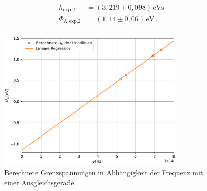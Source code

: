 \begin{align*}
    h_{\text{exp,}2} &= (3,219 \pm 0,098)\,\unit{\eV\second}\\
    \Phi_{\text{A,exp,}2} &= (1,14 \pm 0,06) \, \unit{\eV}\,.\\
\end{align*}
\begin{figure}[H]
    \centering
    \includegraphics[width=0.8\textwidth]{Plots/planck_berechnet.pdf}
    \caption{Berechnete Grenzspannungen in Abhängigkeit der Frequenz mit einer Ausgleichsgerade.}
    \label{fig:Planck_berechnet}
\end{figure}
